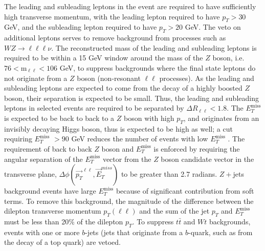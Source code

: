 \documentclass[12pt,a4paper,openright,twoside]{report}
\newcommand{\met}{$E_T^{\mathrm{miss}}$ }
\begin{document}
The leading and subleading leptons in the event are required to have sufficiently high transverse momentum, with the leading lepton required to have $p_T>30$ GeV, and the subleading lepton required to have $p_T>20$ GeV. The veto on additional leptons serves to remove background from processes such as $WZ\to \ell\ell\ell\nu$. The reconstructed mass of the leading and subleading leptons is required to be within a 15 GeV window around the mass of the $Z$ boson, i.e. $76<\mathrm{m_{\ell\ell}<106}$ GeV, to suppress backgrounds where the final state leptons do not originate from a $Z$ boson (non-resonant $\ell\ell$ processes). As the leading and subleading leptons are expected to come from the decay of a highly boosted $Z$ boson, their separation is expected to be small. Thus, the leading and subleading leptons in selected events are required to be separated by $\Delta R_{\ell\ell}<1.8$. The \met is expected to be back to back to a $Z$ boson with high $p_T$, and originates from an invisibly decaying Higgs boson, thus is expected to be high as well; a cut requiring \met$>90$ GeV reduces the number of events with low \met. The requirement of back to back $Z$ boson and \met is enforced by requiring the angular separation of the \met vector from the $Z$ boson candidate vector in the transverse plane, $\Delta\phi(\vec{p_T}^{\ell\ell},\vec{E}_T^{miss})$ to be greater than 2.7 radians. $Z+$jets background events have large \met because of significant contribution from soft terms. To remove this background, the magnitude of the difference between the dilepton transverse momentum $p_T(\ell\ell)$ and the sum of the jet $p_T$ and \met must be less than 20\% of the dilepton $p_T$. To suppress $t\bar{t}$ and $Wt$ backgrounds, events with one or more $b$-jets (jets that originate from a $b$-quark, such as from the decay of a top quark) are vetoed.
\end{document}
